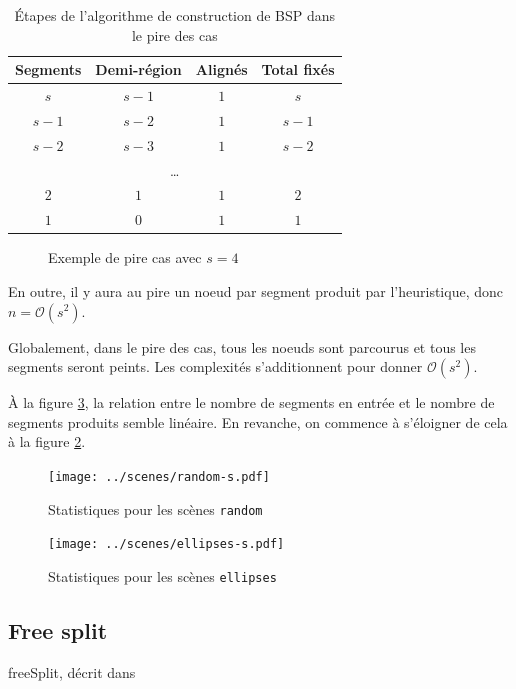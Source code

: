\documentclass[12pt,twocolumn]{article}
\newcommand{\bigO}{\mathcal{O}}
\newcommand{\es}{\emptyset}
\begin{document}
\begin{table}[h]
\center
\begin{tabular}{c||c|c||c}
	Segments & Demi-région & Alignés & Total fixés \\ \hline\hline
	$s$ & $s-1$ & $1$ & $s$ \\ \hline
	$s-1$ & $s-2$ & $1$ & $s-1$ \\ \hline
	$s-2$ & $s-3$ & $1$ & $s-2$ \\ \hline
	\multicolumn{4}{c}{\dots} \\ \hline
	$2$ & $1$ & $1$ & $2$ \\ \hline
	$1$ & $0$ & $1$ & $1$
\end{tabular}
\caption{Étapes de l'algorithme de construction de BSP dans le pire des cas}
\label{tab:worst}
\end{table}

\begin{figure}[h]
\center

\caption{Exemple de pire cas avec $s=4$}\label{fig:worst}
\end{figure}

En outre, il y aura au pire un noeud par segment produit par l'heuristique,
donc $n=\bigO(s^2)$.

Globalement, dans le pire des cas, tous les noeuds sont parcourus et
tous les segments seront peints. Les complexités s'additionnent pour donner
$\bigO(s^2)$.

À la figure \ref{fig:eS}, la relation entre le nombre de segments en entrée et
le nombre de segments produits semble linéaire.
En revanche, on commence à s'éloigner de cela à la figure \ref{fig:rS}.

\begin{figure}[p]
\center
\texttt{[image: ../scenes/random-s.pdf]}
\caption{Statistiques pour les scènes \texttt{random}}\label{fig:rS}
\end{figure}

\begin{figure}[p]
\center
\texttt{[image: ../scenes/ellipses-s.pdf]}
\caption{Statistiques pour les scènes \texttt{ellipses}}\label{fig:eS}
\end{figure}


\subsection{Free split}
\begin{algorithm}
\caption{freeSplit, décrit dans \cite[p.~257]{cg}}
\SetAlgoLined\DontPrintSemicolon
\KwData{$r \neq \es$}
 {
	 {
	}
}
 
~
\end{algorithm}
\end{document}
